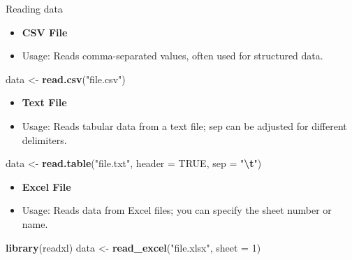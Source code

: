 \documentclass[
  ignorenonframetext,
]{beamer}
\newenvironment{Shaded}{\begin{snugshade}}{\end{snugshade}}
\newcommand{\AttributeTok}[1]{\textcolor[rgb]{0.13,0.29,0.53}{#1}}
\newcommand{\ConstantTok}[1]{\textcolor[rgb]{0.56,0.35,0.01}{#1}}
\newcommand{\DecValTok}[1]{\textcolor[rgb]{0.00,0.00,0.81}{#1}}
\newcommand{\FunctionTok}[1]{\textcolor[rgb]{0.13,0.29,0.53}{\textbf{#1}}}
\newcommand{\NormalTok}[1]{#1}
\newcommand{\OtherTok}[1]{\textcolor[rgb]{0.56,0.35,0.01}{#1}}
\newcommand{\SpecialCharTok}[1]{\textcolor[rgb]{0.81,0.36,0.00}{\textbf{#1}}}
\newcommand{\StringTok}[1]{\textcolor[rgb]{0.31,0.60,0.02}{#1}}
\providecommand{\tightlist}{%
  \setlength{\itemsep}{0pt}\setlength{\parskip}{0pt}}
\begin{document}
\begin{frame}[fragile]{Reading data}
\label{reading-data-2}
\begin{itemize}
\tightlist
\item
  \textbf{CSV File}
\item
  Usage: Reads comma-separated values, often used for structured data.
\end{itemize}

\begin{Shaded}
\begin{Highlighting}[]
\NormalTok{data }\OtherTok{\textless{}{-}} \FunctionTok{read.csv}\NormalTok{(}\StringTok{"file.csv"}\NormalTok{)}
\end{Highlighting}
\end{Shaded}

\begin{itemize}
\tightlist
\item
  \textbf{Text File}\\
\item
  Usage: Reads tabular data from a text file; sep can be adjusted for
  different delimiters.
\end{itemize}

\begin{Shaded}
\begin{Highlighting}[]
\NormalTok{data }\OtherTok{\textless{}{-}} \FunctionTok{read.table}\NormalTok{(}\StringTok{"file.txt"}\NormalTok{, }\AttributeTok{header =} \ConstantTok{TRUE}\NormalTok{, }\AttributeTok{sep =} \StringTok{"}\SpecialCharTok{\textbackslash{}t}\StringTok{"}\NormalTok{)}
\end{Highlighting}
\end{Shaded}

\begin{itemize}
\tightlist
\item
  \textbf{Excel File}
\item
  Usage: Reads data from Excel files; you can specify the sheet number
  or name.
\end{itemize}

\begin{Shaded}
\begin{Highlighting}[]
\FunctionTok{library}\NormalTok{(readxl)}
\NormalTok{data }\OtherTok{\textless{}{-}} \FunctionTok{read\_excel}\NormalTok{(}\StringTok{"file.xlsx"}\NormalTok{, }\AttributeTok{sheet =} \DecValTok{1}\NormalTok{)}
\end{Highlighting}
\end{Shaded}
\end{frame}
\end{document}
